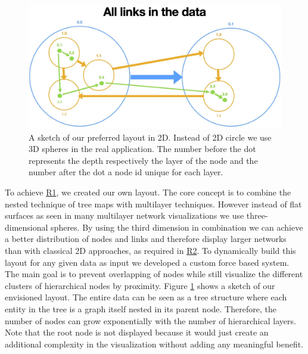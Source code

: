 \begin{figure}[h]
    \centering
    \includegraphics[width=\textwidth, trim={0cm 0cm 0cm 3.5cm},clip]{graphics/filterLinks/allLinks.jpg}
    \caption{A sketch of our preferred layout in 2D. Instead of 2D circle we use 3D spheres in the real application. The number before the dot represents the depth respectively the layer of the node and the number after the dot a node id unique for each layer.} 
    \label{fig:layoutSketch} 
\end{figure}
To achieve \hyperref[req:R1]{R1}, we created our own layout. The core concept is to combine the nested technique of tree maps with multilayer techniques. However instead of flat surfaces as seen in many multilayer network visualizations we use three-dimensional spheres. 
By using the third dimension in combination we can achieve a better distribution of nodes and links and therefore display larger networks than with classical 2D approaches, as required in \hyperref[req:R2]{R2}. 
To dynamically build this layout for any given data as input we developed a custom force based system.
The main goal is to prevent overlapping of nodes while still visualize the different clusters of hierarchical nodes by proximity. Figure \ref{fig:layoutSketch} shows a sketch of our envisioned layout. The entire data can be seen as a tree structure where each entity in the tree is a graph itself nested in its parent node. Therefore, the number of nodes can grow exponentially with the number of hierarchical layers. Note that the root node is not displayed because it would just create an additional complexity in the visualization without adding any meaningful benefit.

